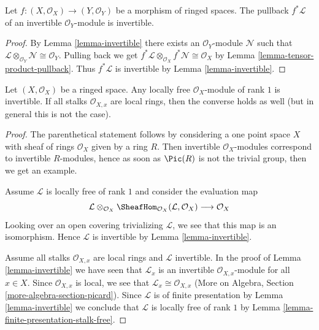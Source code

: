 \begin{lemma}
\label{lemma-pullback-invertible}
Let $f : (X, \mathcal{O}_X) \to (Y, \mathcal{O}_Y)$ be a
morphism of ringed spaces. The pullback $f^*\mathcal{L}$ of an
invertible $\mathcal{O}_Y$-module is invertible.
\end{lemma}

\begin{proof}
By Lemma \ref{lemma-invertible}
there exists an $\mathcal{O}_Y$-module $\mathcal{N}$ such that
$\mathcal{L} \otimes_{\mathcal{O}_Y} \mathcal{N} \cong \mathcal{O}_Y$.
Pulling back we get
$f^*\mathcal{L} \otimes_{\mathcal{O}_X} f^*\mathcal{N} \cong \mathcal{O}_X$
by Lemma \ref{lemma-tensor-product-pullback}.
Thus $f^*\mathcal{L}$ is invertible by Lemma \ref{lemma-invertible}.
\end{proof}

\begin{lemma}
\label{lemma-invertible-is-locally-free-rank-1}
Let $(X, \mathcal{O}_X)$ be a ringed space. Any locally free
$\mathcal{O}_X$-module of rank $1$ is invertible.
If all stalks $\mathcal{O}_{X, x}$ are local rings, then
the converse holds as well (but in general this is not the case).
\end{lemma}

\begin{proof}
The parenthetical statement follows by considering a one point
space $X$ with sheaf of rings $\mathcal{O}_X$ given by a ring $R$.
Then invertible $\mathcal{O}_X$-modules correspond to invertible
$R$-modules, hence as soon as $\Pic(R)$ is not the trivial group,
then we get an example.

\medskip\noindent
Assume $\mathcal{L}$ is locally free of rank $1$ and consider the
evaluation map
$$
\mathcal{L} \otimes_{\mathcal{O}_X}
\SheafHom_{\mathcal{O}_X}(\mathcal{L}, \mathcal{O}_X)
\longrightarrow \mathcal{O}_X
$$
Looking over an open covering trivializing $\mathcal{L}$, we see
that this map is an isomorphism. Hence $\mathcal{L}$ is invertible
by Lemma \ref{lemma-invertible}.

\medskip\noindent
Assume all stalks $\mathcal{O}_{X, x}$ are local rings and $\mathcal{L}$
invertible. In the proof of Lemma \ref{lemma-invertible}
we have seen that $\mathcal{L}_x$ is an invertible
$\mathcal{O}_{X, x}$-module for all $x \in X$. Since
$\mathcal{O}_{X, x}$ is local, we see that
$\mathcal{L}_x \cong \mathcal{O}_{X, x}$
(More on Algebra, Section \ref{more-algebra-section-picard}).
Since $\mathcal{L}$ is of finite presentation by
Lemma \ref{lemma-invertible} we conclude that $\mathcal{L}$
is locally free of rank $1$ by
Lemma \ref{lemma-finite-presentation-stalk-free}.
\end{proof}

